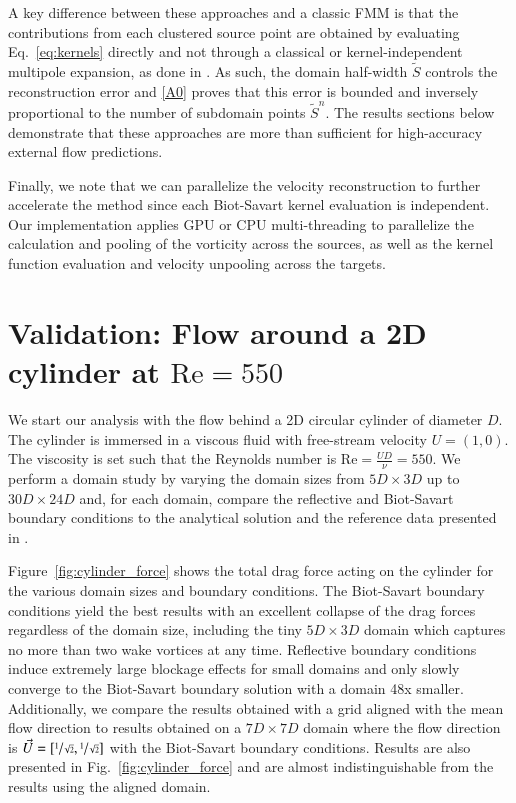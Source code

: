 \documentclass[final,1p,times]{elsarticle}
\begin{document}
A key difference between these approaches and a classic FMM is that the contributions from each clustered source point are obtained by evaluating Eq.~\ref{eq:kernels} directly and not through a classical or kernel-independent multipole expansion, as done in \cite{Ying2004ADimensions, Liska2014AEquations}. As such, the domain half-width $\tilde S$ controls the reconstruction error and \ref{A0} proves that this error is bounded and inversely proportional to the number of subdomain points $\tilde S^n$. The results sections below demonstrate that these approaches are more than sufficient for high-accuracy external flow predictions.

Finally, we note that we can parallelize the velocity reconstruction to further accelerate the method since each Biot-Savart kernel evaluation is independent. Our implementation applies GPU or CPU multi-threading to parallelize the calculation and pooling of the vorticity across the sources, as well as the kernel function evaluation and velocity unpooling across the targets.


\section{Validation: Flow around a 2D cylinder at $\text{Re}=550$}

We start our analysis with the flow behind a 2D circular cylinder of diameter $D$. The cylinder is immersed in a viscous fluid with free-stream velocity $U=(1,0)$. The viscosity is set such that the Reynolds number is $\text{Re}=\frac{UD}{\nu}=550$. We perform a domain study by varying the domain sizes from $5D\times3D$ up to $30D\times24D$ and, for each domain, compare the reflective and Biot-Savart boundary conditions to the analytical solution \cite{Collins1973TheCylinder} and the reference data presented in \cite{KoumoutsakostAN1995High-resolutionMethods, Gillis2019AMethod}. 

Figure~\ref{fig:cylinder_force} shows the total drag force acting on the cylinder for the various domain sizes and boundary conditions. The Biot-Savart boundary conditions yield the best results with an excellent collapse of the drag forces regardless of the domain size, including the tiny $5D\times3D$ domain which captures no more than two wake vortices at any time. Reflective boundary conditions induce extremely large blockage effects for small domains and only slowly converge to the Biot-Savart boundary solution with a domain 48x smaller. Additionally, we compare the results obtained with a grid aligned with the mean flow direction to results obtained on a $7D\times 7D$ domain where the flow direction is $\vec{U}=[\sfrac 1{\sqrt{2}},\sfrac 1{\sqrt{2}}]$ with the Biot-Savart boundary conditions. Results are also presented in Fig.~\ref{fig:cylinder_force} and are almost indistinguishable from the results using the aligned domain.
\end{document}
